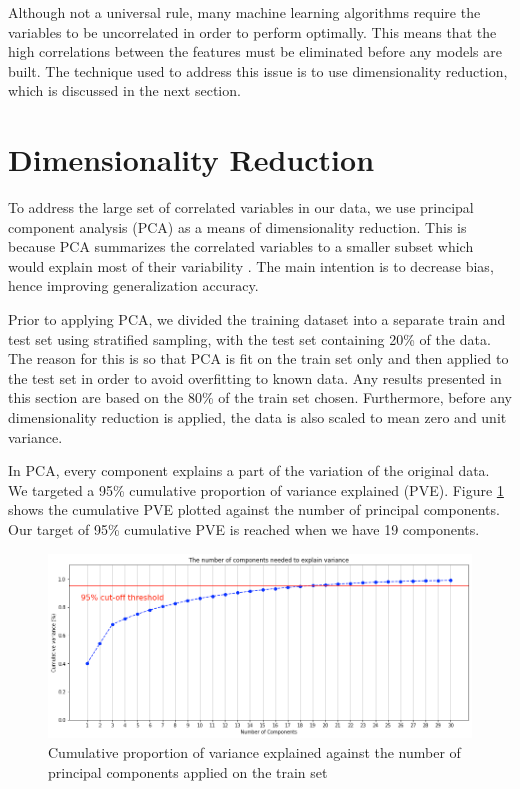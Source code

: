 Although not a universal rule, many machine learning algorithms require the variables to be uncorrelated in order to perform optimally. This means that the high correlations between the features must be eliminated before any models are built. The technique used to address this issue is to use dimensionality reduction, which is discussed in the next section.

\section{Dimensionality Reduction}

To address the large set of correlated variables in our data, we use principal component analysis (PCA) as a means of dimensionality reduction. This is because PCA summarizes the correlated variables to a smaller subset which would explain most of their variability \cite{intro_stat_learning}. The main intention is to decrease bias, hence improving generalization accuracy.

Prior to applying PCA, we divided the training dataset into a separate train and test set using stratified sampling, with the test set containing 20\% of the data. The reason for this is so that PCA is fit on the train set only and then applied to the test set in order to avoid overfitting to known data. Any results presented in this section are based on the 80\% of the train set chosen. Furthermore, before any dimensionality reduction is applied, the data is also scaled to mean zero and unit variance.

In PCA, every component explains a part of the variation of the original data. We targeted a 95\% cumulative proportion of variance explained (PVE). Figure \ref{fig:pve} shows the cumulative PVE plotted against the number of principal components. Our target of 95\% cumulative PVE is reached when we have 19 components.

\begin{figure}
   \centering
   \includegraphics[width=\textwidth]{images/cumulative_pve.png}
   \caption{Cumulative proportion of variance explained against the number of principal components applied on the train set}
   \label{fig:pve}
\end{figure}

